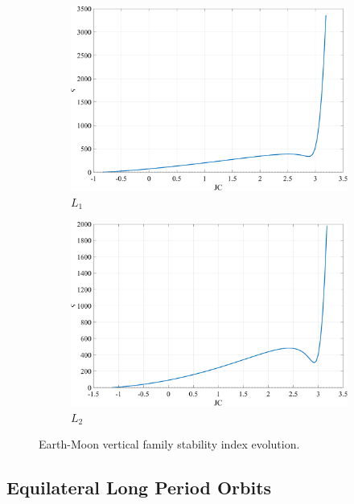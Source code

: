 \begin{figure}[ht]
    \begin{subfigure}[h]{0.4\linewidth}
        \includegraphics[width=\textwidth]{figures/L1VerticalStability.pdf}
        \caption{$L_{1}$}
    \end{subfigure}
    \hfill
    \begin{subfigure}[h]{0.4\linewidth}
        \includegraphics[width=\textwidth]{figures/L2VerticalStability.pdf}
        \caption{$L_{2}$}
    \end{subfigure}
    \caption{Earth-Moon vertical family stability index evolution.}
    \label{fig:verticalStability}
\end{figure}

\subsection{Equilateral Long Period Orbits}
